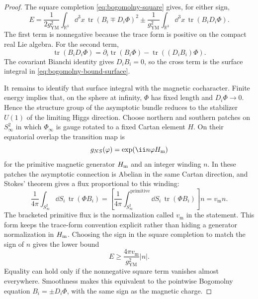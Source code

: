 \begin{proof}
The square completion
\eqref{eq:bogomolny-square} gives, for either sign,
\[
  E
  =
  \frac{1}{2g_{\mathrm{YM}}^2}
  \int_{\mathbb R^3}\dd^3x\,
  \operatorname{tr}(B_i\mp D_i\Phi)^2
  \pm
  \frac{1}{g_{\mathrm{YM}}^2}
  \int_{\mathbb R^3}\dd^3x\,
  \operatorname{tr}(B_iD_i\Phi).
\]
The first term is nonnegative because the trace form is positive on the
compact real Lie algebra.  For the second term,
\[
  \operatorname{tr}(B_iD_i\Phi)
  =
  \partial_i\operatorname{tr}(B_i\Phi)
  -
  \operatorname{tr}((D_iB_i)\Phi).
\]
The covariant Bianchi identity gives \(D_iB_i=0\), so the cross term is the
surface integral in \eqref{eq:bogomolny-bound-surface}.

It remains to identify that surface integral with the magnetic cocharacter.
Finite energy implies that, on the sphere at infinity, \(\Phi\) has fixed
length and \(D_i\Phi\to0\).  Hence the structure group of the asymptotic
bundle reduces to the stabilizer \(U(1)\) of the limiting Higgs direction.
Choose northern and southern patches on \(S^2_\infty\) in which
\(\Phi_\infty\) is gauge rotated to a fixed Cartan element \(H\).  On their
equatorial overlap the transition map is
\[
  g_{NS}(\varphi)=\exp(\ii n\varphi H_{\rm m})
\]
for the primitive magnetic generator \(H_{\rm m}\) and an integer winding
\(n\).  In these patches the asymptotic connection is Abelian in the same
Cartan direction, and Stokes' theorem gives a flux proportional to this
winding:
\[
  \frac{1}{4\pi}
  \int_{S^2_\infty}\dd S_i\,\operatorname{tr}(\Phi B_i)
  =
  \left[
  \frac{1}{4\pi}
  \int_{S^2_\infty}^{\text{primitive}}
  \dd S_i\,\operatorname{tr}(\Phi B_i)
  \right] n
  =
  v_{\mathrm m}n .
\]
The bracketed primitive flux is the normalization called \(v_{\mathrm m}\)
in the statement.  This form keeps the trace-form convention explicit rather
than hiding a generator normalization in \(H_{\rm m}\).  Choosing the sign in
the square completion to match the sign of \(n\) gives the lower bound
\[
  E\ge \frac{4\pi v_{\mathrm m}}{g_{\mathrm{YM}}^2}|n|.
\]
Equality can hold only if the nonnegative square term vanishes almost
everywhere.  Smoothness makes this equivalent to the pointwise Bogomolny
equation \(B_i=\pm D_i\Phi\), with the same sign as the magnetic charge.
\end{proof}

